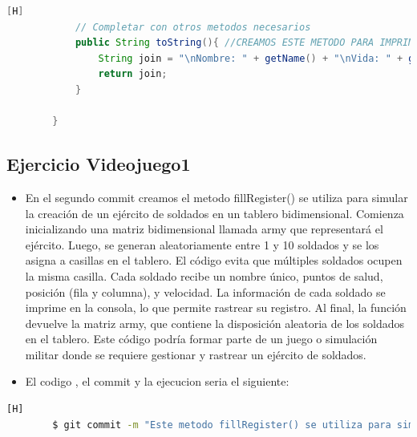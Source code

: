 \documentclass{article}
\begin{document}
\begin{lstlisting}[language=java,caption={Las lineas de codigos del metodo creado:}][H]
			// Completar con otros metodos necesarios
			public String toString(){ //CREAMOS ESTE METODO PARA IMPRIMIR LOS DATOS DEl OBJETO
				String join = "\nNombre: " + getName() + "\nVida: " + getLifeActual() + "\nFila: " + getRow() + "\nColumna: " + getColumn() + "\nNivel de ataque: " + getAttackLevel() + "\nNivel de Defensa: " + getDefenseLevel() + "\nNivel de vida: " + getLifeLevel() + "\nVelocidad: " + getSpeed() + "\nActitud: " + getAttitude() + "\nEstado: " + getLives(); //Agregamos un espaciador para poder separar
				return join;
			}
			
		}

	\end{lstlisting}
	\subsection{Ejercicio Videojuego1}
	\begin{itemize}	
		\item En el segundo commit creamos el metodo fillRegister() se utiliza para simular la creación de un ejército de soldados en un tablero bidimensional. Comienza inicializando una matriz bidimensional llamada army que representará el ejército. Luego, se generan aleatoriamente entre 1 y 10 soldados y se los asigna a casillas en el tablero. El código evita que múltiples soldados ocupen la misma casilla. Cada soldado recibe un nombre único, puntos de salud, posición (fila y columna), y velocidad. La información de cada soldado se imprime en la consola, lo que permite rastrear su registro. Al final, la función devuelve la matriz army, que contiene la disposición aleatoria de los soldados en el tablero. Este código podría formar parte de un juego o simulación militar donde se requiere gestionar y rastrear un ejército de soldados.
		\item El codigo , el commit y la ejecucion seria el siguiente:
	\end{itemize}	
	\begin{lstlisting}[language=bash,caption={Commit}][H]
		$ git commit -m "Este metodo fillRegister() se utiliza para simular la creacion de un ejercito de soldados en un tablero bidimensional Comienza inicializando una matriz bidimensional llamada army que representara el ejercito. Luego, se generan aleatoriamente entre 1 y 10 soldados y se los asigna a casillas en el tablero. El codigo evita que multiples soldados ocupen la misma casilla. Cada soldado recibe un nombre unico, puntos de salud, posicion (fila y columna), y velocidad. La informacion de cada soldado se imprime en la consola, lo que permite rastrear su registro. Al final, la funcion devuelve la matriz army, que contiene la disposicion aleatoria de los soldados en el tablero. Este codigo podria formar parte de un juego o simulacion militar donde se requiere gestionar y rastrear un ejercito de soldados."
	\end{lstlisting}	
\end{document}
